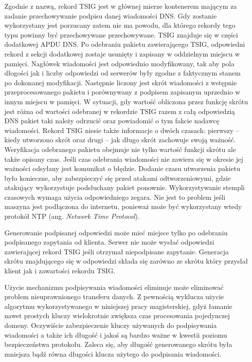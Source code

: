 Zgodnie z nazwą, rekord TSIG jest w głównej mierze kontenerem mającym za zadanie przechowywanie podpisu danej wiadomości DNS.
Gdy zostanie wykorzystany jest porzucany zatem nie ma powodu, dla którego rekordy tego typu powinny być przechowywane przechowywane.
TSIG znajduje się w części dodatkowej APDU DNS. Po odebraniu pakietu zawierającego TSIG, odpowiedni rekord z sekcji dodatkowej zostaje
usunięty i zapisany w oddzielnym miejscu w pamięci. Nagłówek wiadomości jest odpowiednio modyfikowany, tak aby pola dłogości jak i
liczby odpowiedzi od serwerów były zgodne z faktycznym stanem po dokonanej modyfikacji. Następnie liczony jest skrót wiadomości z
wstępnie przeprocesowanego pakietu i porównywany z podpisem zapisanym uprzednio w innym miejscu w pamięci. W sytuacji, gdy wartość
obliczona przez funkcję skrótu jest różna od wartości odebranej w rekordzie TSIG razem z całą odpowiedzią DNS pakiet taki należy
odrzucić oraz powiadomić o tym fakcie nadawcę wiadomości. Rekord TSIG niesie także informacje o dwóch czasach: pierwszy -- kiedy
utworzono skrót oraz drugi -- jak długo skrót zachowuje swoją ważność. Weryfikacja odebranego pakietu obejmuje nie tylko wartość
funkcji skrótu ale także opisany czas. Jeśli czas odebrania wiadomości nie zawiera się w okresie jej ważności odsyłany jest komunikat
o błędzie. Dodanie czasu utworzenia pakietu było konieczne, aby zabezpieczyć się przed atakami odtworzeniowymi, gdzie atakujący
wykorzystuje podsłuchany pakiet ponownie. Wykorzystywanie stempli czasowych wymaga użycia odpowiedniego zegara. Nie jest to problem
jeśli maszyna jest podłączona do internetu, ponieważ może być wykorzystany wtedy protokół NTP (ang.
\textit{Network Time Protocol})\cite{RFC5905}.

Generowanie podpisanej odpowiedzi może mieć miejsce tylko po odebraniu podpisanego zapytania od klienta. Serwer nie może wysłać
odpowiedzi zawierającej rekord TSIG jeśli otrzymał niepodpisane zapytanie. Generacja skrótu znajdującego się w odpowiedzi składa
się zarówno ze skrótu który przysłał klient jak i zawartości rekordu TSIG\cite{nask-tsig}.

Użycie mechanizmu podpisywania wiadomości eliminuje może eliminować problem nieuprawnionego transferu danych. Z pewnością wyklucza
użycie algorytmu wykorzystywanego w niniejszej pracy magisterskiej, gdyż łamanie nawet prostych kluczy wielokrotnie zwiększa czas
procesowania pojedynczej domeny\cite{nask-tsig}. Oczywiście zabezpieczenie kluczy używanych do podpisywania wiadomości a także ich
długość i jakoś są bardzo ważne w kwestii poziomu bezpieczeństwa protokołu. Zaleca się, aby długość generowanego skrótu była mniejsza
bądź równa długości klucza użytego do podpisania wiadomości.

